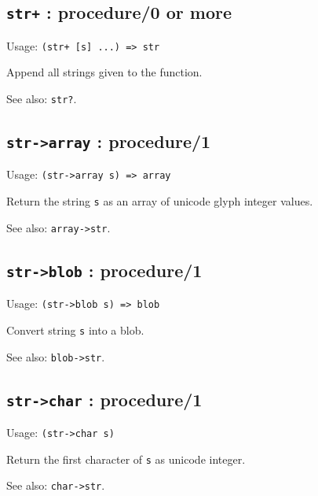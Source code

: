 \documentclass[
]{article}
\newcommand{\passthrough}[1]{#1}
\begin{document}
\hypertarget{str-procedure0-or-more-1}{%
\subsection{\texorpdfstring{\texttt{str+} : procedure/0 or
more}{str+ : procedure/0 or more}}\label{str-procedure0-or-more-1}}

Usage: \passthrough{\lstinline!(str+ [s] ...) => str!}

Append all strings given to the function.

See also: \passthrough{\lstinline!str?!}.

\hypertarget{str-array-procedure1-1}{%
\subsection{\texorpdfstring{\texttt{str-\textgreater{}array} :
procedure/1}{str-\textgreater array : procedure/1}}\label{str-array-procedure1-1}}

Usage: \passthrough{\lstinline!(str->array s) => array!}

Return the string \passthrough{\lstinline!s!} as an array of unicode
glyph integer values.

See also: \passthrough{\lstinline!array->str!}.

\hypertarget{str-blob-procedure1-1}{%
\subsection{\texorpdfstring{\texttt{str-\textgreater{}blob} :
procedure/1}{str-\textgreater blob : procedure/1}}\label{str-blob-procedure1-1}}

Usage: \passthrough{\lstinline!(str->blob s) => blob!}

Convert string \passthrough{\lstinline!s!} into a blob.

See also: \passthrough{\lstinline!blob->str!}.

\hypertarget{str-char-procedure1-1}{%
\subsection{\texorpdfstring{\texttt{str-\textgreater{}char} :
procedure/1}{str-\textgreater char : procedure/1}}\label{str-char-procedure1-1}}

Usage: \passthrough{\lstinline!(str->char s)!}

Return the first character of \passthrough{\lstinline!s!} as unicode
integer.

See also: \passthrough{\lstinline!char->str!}.
\end{document}
